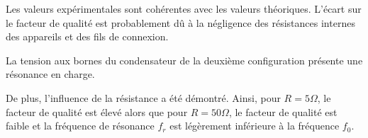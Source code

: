 \documentclass[a4paper,9pt,french]{scrartcl}
\begin{document}
Les valeurs expérimentales sont cohérentes avec les valeurs théoriques. L'écart sur le facteur de qualité est probablement dû à la négligence des résistances internes des appareils et des fils de connexion.

La tension aux bornes du condensateur de la deuxième configuration présente une résonance en charge.

De plus, l'influence de la résistance a été démontré. Ainsi, pour \(R=5\Omega\), le facteur de qualité est élevé alors que pour \(R=50\Omega\), le facteur de qualité est faible et la fréquence de résonance \(f_r\) est légèrement inférieure à la fréquence \(f_0\).
\end{document}
